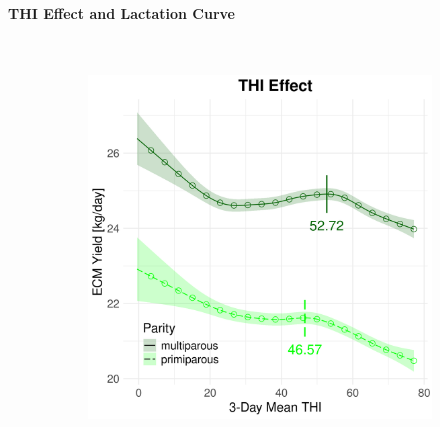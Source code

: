 \newpage
\paragraph{THI Effect and Lactation Curve} \quad \\
\begin{figure}[H]
    \centering
    \begin{subfigure}[b]{0.45\textwidth}
        \centering
        \includegraphics[width=\textwidth]{thesis/figures/models/ecm/after2010/je_ecm_after2010/je_ecm_after2010_marginal_thi_milk_combined.png}
    \end{subfigure}
    \hspace{0.05\textwidth} %
    \begin{subfigure}[b]{0.45\textwidth}
        \centering

\end{subfigure}
\end{figure}
